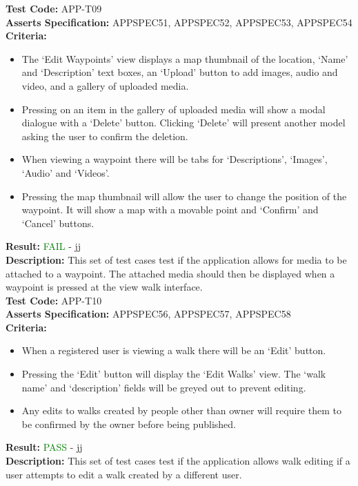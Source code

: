 \documentclass[11pt,a4paper]{report}
\begin{document}
\label{test:APP-T09}
\noindent\textbf{Test Code:} APP-T09\\
\textbf{Asserts Specification:} APPSPEC51, APPSPEC52, APPSPEC53, APPSPEC54\\ 
\textbf{Criteria:} \begin{itemize}
                     \item The `Edit Waypoints' view displays a map thumbnail of the location, `Name' and `Description' text boxes, an `Upload' button to add images, audio and video, and a gallery of uploaded media.
                     \item Pressing on an item in the gallery of uploaded media will show a modal dialogue with a `Delete' button. Clicking `Delete' will present another model asking the user to confirm the deletion.
                     \item When viewing a waypoint there will be tabs for `Descriptions', `Images', `Audio' and `Videos'.
                     \item Pressing the map thumbnail will allow the user to change the position of the waypoint. It will show a map with a movable point and `Confirm' and `Cancel' buttons.
                   \end{itemize}
\textbf{Result:} \textcolor{green}{FAIL} - jj\\
\textbf{Description:} This set of test cases test if the application allows for media to be attached to a waypoint. The attached media should then be displayed when a waypoint is pressed at the view walk interface.\\

\label{test:APP-T10}
\noindent\textbf{Test Code:} APP-T10\\
\textbf{Asserts Specification:} APPSPEC56, APPSPEC57, APPSPEC58\\ 
\textbf{Criteria:} \begin{itemize}
                     \item When a registered user is viewing a walk there will be an `Edit' button.
                     \item Pressing the `Edit' button will display the `Edit Walks' view. The `walk name' and `description' fields will be greyed out to prevent editing.
                     \item Any edits to walks created by people other than owner will require them to be confirmed by the owner before being published.
                     
                   \end{itemize}
\textbf{Result:} \textcolor{green}{PASS} - jj\\
\textbf{Description:} This set of test cases test if the application allows walk editing if a user attempts to edit a walk created by a different user.\\
\end{document}
